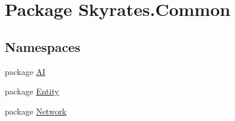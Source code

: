 \hypertarget{namespace_skyrates_1_1_common}{\section{Package Skyrates.\-Common}
\label{namespace_skyrates_1_1_common}
}
\subsection*{Namespaces}
\begin{DoxyCompactItemize}
\item 
package \hyperlink{namespace_skyrates_1_1_common_1_1_a_i}{A\-I}
\item 
package \hyperlink{namespace_skyrates_1_1_common_1_1_entity}{Entity}
\item 
package \hyperlink{namespace_skyrates_1_1_common_1_1_network}{Network}
\end{DoxyCompactItemize}
